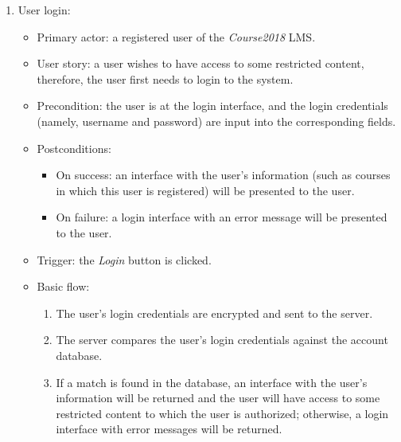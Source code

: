 \begin{enumerate}
\item User login:
\begin{itemize}
\item Primary actor:
    a registered user of the \emph{Course2018} LMS.
\item User story:
    a user wishes to have access to some restricted content, therefore, the user 
    first needs to login to the system.
\item Precondition:
    the user is at the login interface, and the login credentials
    (namely, username and password) are input into the corresponding fields.
\item Postconditions:
    \begin{itemize}
        \item On success: an interface with the user's information (such as courses
            in which this user is registered) will be presented to the user.
        \item On failure: a login interface with an error message will be
            presented to the user.
    \end{itemize}
\item Trigger: the \emph{Login} button is clicked.
\item Basic flow:
    \begin{enumerate}
        \item The user's login credentials are encrypted and sent to the
            server.
        \item The server compares the user's login credentials against the
            account database.
        \item If a match is found in the database, an interface with the user's
            information will be returned and the user will have access to
            some restricted content to which the user is authorized; otherwise,
            a login interface with error messages will be returned.
    \end{enumerate}
\end{itemize}


\end{enumerate}
